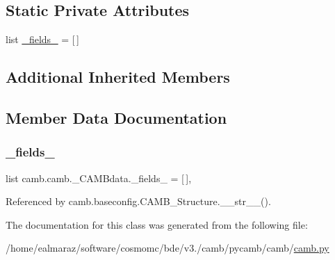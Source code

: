 \subsection*{Static Private Attributes}
\begin{DoxyCompactItemize}
\item 
list \mbox{\hyperlink{classcamb_1_1camb_1_1__CAMBdata_a756274697db264f0dfee291216d60f46}{\+\_\+fields\+\_\+}} = \mbox{[}$\,$\mbox{]}
\end{DoxyCompactItemize}
\subsection*{Additional Inherited Members}


\subsection{Member Data Documentation}
\mbox{\label{classcamb_1_1camb_1_1__CAMBdata_a756274697db264f0dfee291216d60f46}} 
\subsubsection{\texorpdfstring{\+\_\+fields\+\_\+}{\_fields\_}}
{\footnotesize\ttfamily list camb.\+camb.\+\_\+\+C\+A\+M\+Bdata.\+\_\+fields\+\_\+ = \mbox{[}$\,$\mbox{]}\hspace{0.3cm}{\ttfamily [static]}, {\ttfamily [private]}}



Referenced by camb.\+baseconfig.\+C\+A\+M\+B\+\_\+\+Structure.\+\_\+\+\_\+str\+\_\+\+\_\+().



The documentation for this class was generated from the following file\+:\begin{DoxyCompactItemize}
\item 
/home/ealmaraz/software/cosmomc/bde/v3./camb/pycamb/camb/\mbox{\hyperlink{camb_8py}{camb.\+py}}\end{DoxyCompactItemize}
